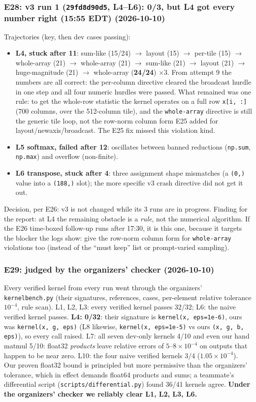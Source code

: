 \documentclass[11pt]{article}
\newcommand{\code}[1]{\texttt{#1}}
\newcommand{\entry}[2]{\subsubsection*{#1 \textnormal{\small(#2)}}}
\begin{document}
\entry{E28: v3 run 1 (\code{29fd8d90d5}, L4--L6): 0/3, but L4 got every number right (15:55 EDT)}{2026-10-10}
Trajectories (key, then dev cases passing):
\begin{itemize}
  \item \textbf{L4, stuck after 11}: sum-like (15/24) $\to$ layout (15) $\to$ per-tile (15) $\to$
        whole-array (21) $\to$ whole-array (21) $\to$ sum-like (21) $\to$ layout (21) $\to$ huge-magnitude
        (21) $\to$ whole-array (\textbf{24/24}) $\times3$. From attempt 9 the numbers are all correct:
        the per-column directive cleared the broadcast hurdle in one step and all four numeric hurdles
        were passed. What remained was one rule: to get the whole-row statistic the kernel operates on a
        full row \code{x[i, :]} (700 columns, over the 512-column tile), and the \code{whole-array}
        directive is still the generic tile loop, not the row-norm column form E25 added for
        layout/newaxis/broadcast. The E25 fix missed this violation kind.
  \item \textbf{L5 softmax, failed after 12}: oscillates between banned reductions (\code{np.sum},
        \code{np.max}) and overflow (non-finite).
  \item \textbf{L6 transpose, stuck after 4}: three assignment shape mismatches (a \code{(0,)} value into a
        \code{(188,)} slot); the more specific v3 crash directive did not get it out.
\end{itemize}
Decision, per E26: v3 is not changed while its 3 runs are in progress. Finding for the report: at L4 the
remaining obstacle is a \emph{rule}, not the numerical algorithm. If the E26 time-boxed follow-up runs
after 17:30, it is this one, because it targets the blocker the logs show: give the row-norm column form
for \code{whole-array} violations too (instead of the ``must keep'' list or prompt-varied sampling).

\entry{E29: judged by the organizers' checker}{2026-10-10}
Every verified kernel from every run went through the organizers' \code{kernelbench.py} (their
signatures, references, cases, per-element relative tolerance $10^{-4}$, rule scan). L1, L2, L3: every
verified kernel passes 32/32; L6: the naive verified kernel passes. \textbf{L4: 0/32}: their signature is
\code{kernel(x, eps=1e-6)}, ours was \code{kernel(x, g, eps)} (L8 likewise, \code{kernel(x, eps=1e-5)} vs
ours \code{(x, g, b, eps)}), so every call raised. L7: all seven dev-only kernels 4/10 and even our hand
matmul 5/10: float32 \emph{products} leave relative errors of $5$--$8\times10^{-4}$ on outputs that happen to
be near zero. L10: the four naive verified kernels 3/4 ($1.05\times10^{-4}$). Our proven float32 bound
is principled but more permissive than the organizers' tolerance, which in effect demands float64
products and sums; a teammate's differential script (\code{scripts/differential.py}) found 36/41 kernels
agree. \textbf{Under the organizers' checker we reliably clear L1, L2, L3, L6.}
\end{document}
